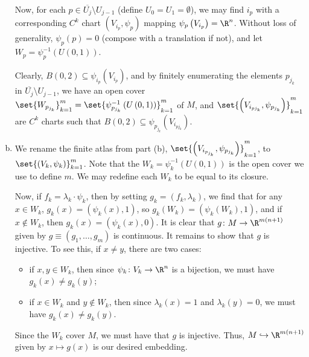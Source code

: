 \documentclass[10pt]{mypackage}
\begin{document}
\begin{solution}
\begin{enumerate}[(a)]
      Now, for each $p\in \overline{U_{j}}\setminus U_{j-1}$ (define $U_{0} = U_{1} = \emptyset$), we may find $i_p$ with a corresponding $C^{k}$ chart $\left( V_{i_p},\psi_{p} \right)$ mapping $\psi_{p}\left( V_{i_p} \right) = \R^{n}$. Without loss of generality, $\psi_{p}\left( p \right) = 0$ (compose with a translation if not), and let $W_p = \psi_{p}^{-1}\left( U\left( 0,1 \right) \right)$.\newline

      Clearly, $B\left( 0,2 \right)\subseteq \psi_{i_p}\left( V_{i_p} \right)$, and by finitely enumerating the elements $p_{j_k}$ in $ \overline{U_{j}}\setminus U_{j-1} $, we have an open cover $\set{W_{p_{j_k}}}_{k=1}^{m} = \set{\psi_{p_{j_k}}^{-1}\left( U\left( 0,1 \right) \right)}_{k=1}^{m}$ of $M$, and $\set{\left( V_{i_{p{j_k}}},\psi_{p_{j_k}} \right)}_{k=1}^{m}$ are $ C^{k}$ charts such that $B\left( 0,2 \right)\subseteq \psi_{p_{j_k}}\left( V_{i_{p{j_k}}} \right)$.
    \item We rename the finite atlas from part (b), $\set{\left( V_{i_{p_{j_k}}},\psi_{p_{j_k}} \right)}_{k=1}^{m}$, to $\set{\left( V_k,\psi_{k} \right)}_{k=1}^{m}$. Note that the $W_k = \psi_k^{-1}\left( U\left( 0,1 \right) \right)$ is the open cover we use to define $m$. We may redefine each $W_k$ to be equal to its closure.

      Now, if $f_k = \lambda_k\cdot \psi_k$, then by setting $g_k = \left( f_k,\lambda_k \right)$, we find that for any $x\in W_k$, $g_k(x) = \left( \psi_k(x),1 \right)$, so $g_k\left( W_k \right) = \left( \psi_k\left(W_k\right),1 \right)$, and if $x\notin W_k$, then $g_k(x) = \left( \psi_k(x),0 \right)$. It is clear that $g \colon M\rightarrow \R^{m\left( n+1 \right)}$ given by $ g\equiv \left( g_1,\dots,g_m \right)$ is continuous. It remains to show that $g$ is injective. To see this, if $x\neq y$, there are two cases:
      \begin{itemize}
        \item if $x,y\in W_k$, then since $\psi_k\colon V_k\rightarrow \R^{n}$ is a bijection, we must have $g_k(x)\neq g_k(y)$;
        \item if $x\in W_k$ and $y\notin W_k$, then since $\lambda_k(x) = 1$ and $\lambda_k(y) = 0$, we must have $g_k(x) \neq g_k(y)$.
      \end{itemize}
      Since the $W_k$ cover $M$, we must have that $g$ is injective. Thus, $M\hookrightarrow \R^{m\left( n+1 \right)}$ given by $x\mapsto g(x)$ is our desired embedding.
  \end{enumerate}
\end{solution}
\end{document}
